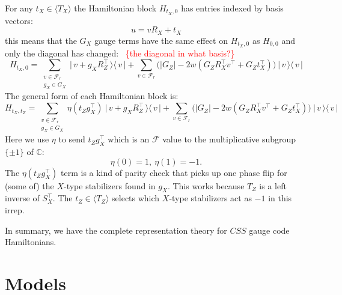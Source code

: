 \documentclass[11pt,oneside]{article}
\newcommand{\todo}[1]{\ \textcolor{red}{\{#1\}}\ }
\def\Complex{\mathbb{C}}
\newcommand{\bket}[1]{\bigl|\,{#1}\,\bigr\rangle}
\newcommand{\bbra}[1]{\bigl\langle\,{#1}\,\bigr|}
\def\Span#1{\langle #1 \rangle}
\newcommand{\Field}{\mathcal{F}}
\def\Frd{\Field_{r}}
\begin{document}
For any $t_X\in \Span{T_X}$ the Hamiltonian block $H_{t_X,0}$
has entries indexed by basis vectors:
$$
    u = v R_X + t_X
$$
this means that the $G_X$ gauge terms
have the same effect on $H_{t_X,0}$
as $H_{0,0}$ and only the diagonal has changed: \todo{the diagonal in what basis?}
\begin{equation}\label{hamblocktx}
H_{t_X,0} = \sum_{\substack{v\in\Frd\\g_X\in G_X } }
  \bket{v+g_X  R_Z^\top}\bbra{v} 
  + \sum_{v\in\Frd} \bigl(
    |G_Z| - 2w(G_Z R_X^\top v^\top + G_Z t_X^\top)
    \bigr) \ \bket{v}\bbra{v}
\end{equation}
The general form of
each Hamiltonian block is:
\begin{equation}\label{hamblockgen}
H_{t_X,t_Z} = \sum_{\substack{v\in\Frd\\g_X\in G_X } }
    \eta(t_Z g_X^\top)
  \ \bket{v+g_X  R_Z^\top}\bbra{v} 
  + \sum_{v\in\Frd} \bigl(
    |G_Z| - 2w(G_Z R_X^\top v^\top + G_Z t_X^\top)
    \bigr) \ \bket{v}\bbra{v}
\end{equation}
Here we use $\eta$ to send 
$t_Zg_X^\top$ which is an $\Field$ value
to the multiplicative subgroup $\{\pm1\}$
of $\Complex:$
$$
    \eta(0) = 1,\ \eta(1) = -1.
$$
The $\eta(t_Zg_X^\top)$ term
is a kind of parity check that
picks up one phase flip for (some of)
the $X$-type stabilizers found in $g_X.$
This works because $T_Z$ is a left inverse
of $S_X^\top.$
The $t_Z\in\Span{T_Z}$ selects which
$X$-type stabilizers act as $-1$ in this irrep.

In summary, we have the complete representation
theory for $CSS$ gauge code Hamiltonians.


%

\section{Models}
\end{document}
